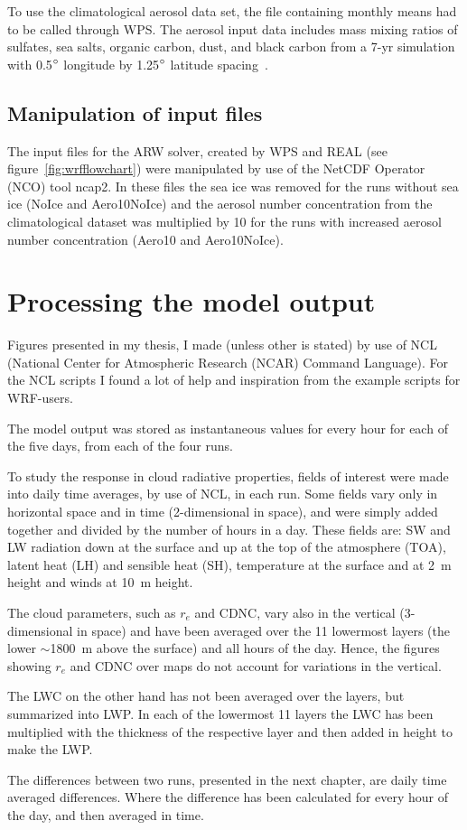 To use the climatological aerosol data set, the file containing monthly means had to be called through WPS. The aerosol input data includes mass mixing ratios of sulfates, sea salts, organic carbon, dust, and black carbon from a 7-yr simulation with 0.5$\degree$ longitude by 1.25$\degree$ latitude spacing~\citep{Thompson2014}.

\subsection{Manipulation of input files}
The input files for the ARW solver, created by WPS and REAL (see figure~\ref{fig:wrfflowchart}) were manipulated by use of the NetCDF Operator (NCO) tool ncap2. In these files the sea ice was removed for the runs without sea ice (NoIce and Aero10NoIce) and the aerosol number concentration from the climatological dataset was multiplied by 10 for the runs with increased aerosol number concentration (Aero10 and Aero10NoIce).

\section{Processing the model output}
Figures presented in my thesis, I made (unless other is stated) by use of NCL (National Center for Atmospheric Research (NCAR) Command Language). For the NCL scripts I found a lot of help and inspiration from the example scripts for WRF-users.%

The model output was stored as instantaneous values for every hour for each of the five days, from each of the four runs. 

To study the response in cloud radiative properties, fields of interest were made into daily time averages, by use of NCL, in each run. Some fields vary only in horizontal space and in time (2-dimensional in space), and were simply added together and divided by the number of hours in a day. These fields are: SW and LW radiation down at the surface and up at the top of the atmosphere (TOA), latent heat (LH) and sensible heat (SH), temperature at the surface and at 2~m height and winds at 10~m height.

The cloud parameters, such as $r_e$ and CDNC, vary also in the vertical (3-dimensional in space) and have been averaged over the 11 lowermost layers (the lower $\sim$1800~m above the surface) and all hours of the day. Hence, the figures showing $r_e$ and CDNC over maps do not account for variations in the vertical.

The LWC on the other hand has not been averaged over the layers, but summarized into LWP. In each of the lowermost 11 layers the LWC has been multiplied with the thickness of the respective layer and then added in height to make the LWP.

The differences between two runs, presented in the next chapter, are daily time averaged differences. Where the difference has been calculated for every hour of the day, and then averaged in time.